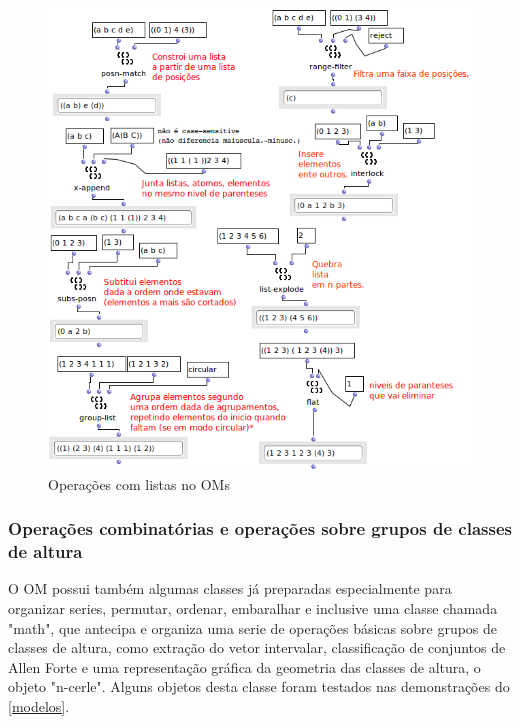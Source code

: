 \documentclass[
	12pt,				%
	openright,			%
	twoside,			%
	a4paper,			%
	english,			%
	french,				%
	spanish,			%
	brazil				%
	]{abntex2}
\begin{document}
\begin{figure}[!h]
	\caption{\label{fig_grafico}Operações com listas no OMs}
	\begin{center}
	    \includegraphics[scale=0.7]{OMPD/OM-listas01.png}
	\end{center}
\end{figure}


\subsubsection{Operações combinatórias e operações sobre grupos de classes de altura }

O OM possui também algumas classes já preparadas especialmente para organizar series, permutar, ordenar, embaralhar e inclusive uma classe chamada "math", que antecipa e organiza uma serie de operações básicas sobre grupos de classes de altura, como extração do vetor intervalar, classificação de conjuntos de Allen Forte e uma representação gráfica da geometria das classes de altura, o objeto "n-cerle"\cite{andreatta2003implementing}. Alguns objetos desta classe foram testados nas demonstrações do \autoref{modelos}.
\end{document}
